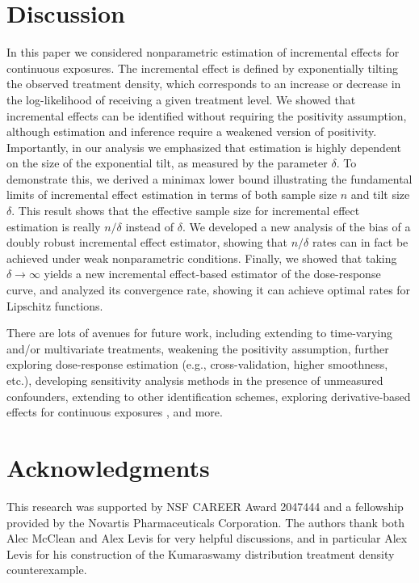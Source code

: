 \documentclass[11pt,twoside]{article}
\theoremstyle{definition}
\theoremstyle{remark}
\begin{document}
\section{Discussion} \label{discussion_section}

In this paper we considered nonparametric estimation of incremental effects for continuous exposures. The incremental effect is defined by exponentially tilting the observed treatment density, which corresponds to an increase or decrease in the log-likelihood of receiving a given treatment level. We showed that incremental effects can be identified without requiring the positivity assumption, although estimation and inference require a weakened version of positivity. Importantly, in our analysis we emphasized that estimation is highly dependent on the size of the exponential tilt, as measured by the parameter $\delta$. To demonstrate this, we derived a minimax lower bound illustrating the fundamental limits of incremental effect estimation in terms of both sample size $n$ and tilt size $\delta$. This result shows that the effective sample size for incremental effect estimation is really $n/\delta$ instead of $\delta$. We developed a new analysis of the bias of a doubly robust incremental effect estimator, showing that $n/\delta$ rates can in fact be achieved under weak nonparametric conditions. Finally, we showed that taking $\delta \to \infty$ yields a new incremental effect-based estimator of  the dose-response curve, and analyzed its convergence rate, showing it can achieve optimal rates for Lipschitz functions.

There are lots of avenues for future work, including extending to time-varying and/or multivariate treatments, weakening the positivity assumption, further exploring dose-response estimation (e.g., cross-validation, higher smoothness, etc.), developing sensitivity analysis methods in the presence of unmeasured confounders, extending to other identification schemes, exploring derivative-based effects for continuous exposures \citep{zhou2022marginalinterventionaleffects, McCleanBransonKennedy+2024}, and more. 

\section*{Acknowledgments}
This research was supported by NSF CAREER Award 2047444  and  a fellowship provided by the Novartis Pharmaceuticals Corporation. The authors thank both Alec McClean and Alex Levis for very helpful discussions, and in particular Alex Levis for his construction of the Kumaraswamy distribution treatment density counterexample.
\end{document}
